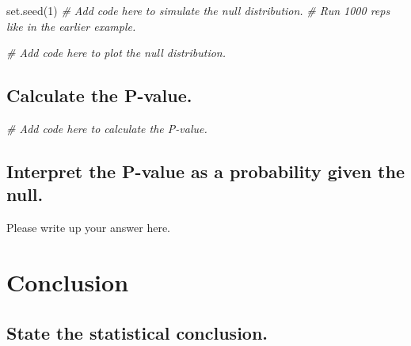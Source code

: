 \documentclass[
]{book}
\newenvironment{Shaded}{\begin{snugshade}}{\end{snugshade}}
\newcommand{\CommentTok}[1]{\textcolor[rgb]{0.56,0.35,0.01}{\textit{#1}}}
\newcommand{\DecValTok}[1]{\textcolor[rgb]{0.00,0.00,0.81}{#1}}
\newcommand{\FunctionTok}[1]{\textcolor[rgb]{0.00,0.00,0.00}{#1}}
\newcommand{\NormalTok}[1]{#1}
\begin{document}
\begin{Shaded}
\begin{Highlighting}[]
\FunctionTok{set.seed}\NormalTok{(}\DecValTok{1}\NormalTok{)}
\CommentTok{\# Add code here to simulate the null distribution.}
\CommentTok{\# Run 1000 reps like in the earlier example.}
\end{Highlighting}
\end{Shaded}

\begin{Shaded}
\begin{Highlighting}[]
\CommentTok{\# Add code here to plot the null distribution.}
\end{Highlighting}
\end{Shaded}

\hypertarget{calculate-the-p-value.-3}{%
\subsection*{Calculate the P-value.}\label{calculate-the-p-value.-3}}

\begin{Shaded}
\begin{Highlighting}[]
\CommentTok{\# Add code here to calculate the P{-}value.}
\end{Highlighting}
\end{Shaded}

\hypertarget{interpret-the-p-value-as-a-probability-given-the-null.-3}{%
\subsection*{Interpret the P-value as a probability given the null.}\label{interpret-the-p-value-as-a-probability-given-the-null.-3}}

Please write up your answer here.

\hypertarget{conclusion-3}{%
\section*{Conclusion}\label{conclusion-3}}

\hypertarget{state-the-statistical-conclusion.-3}{%
\subsection*{State the statistical conclusion.}\label{state-the-statistical-conclusion.-3}}
\end{document}
